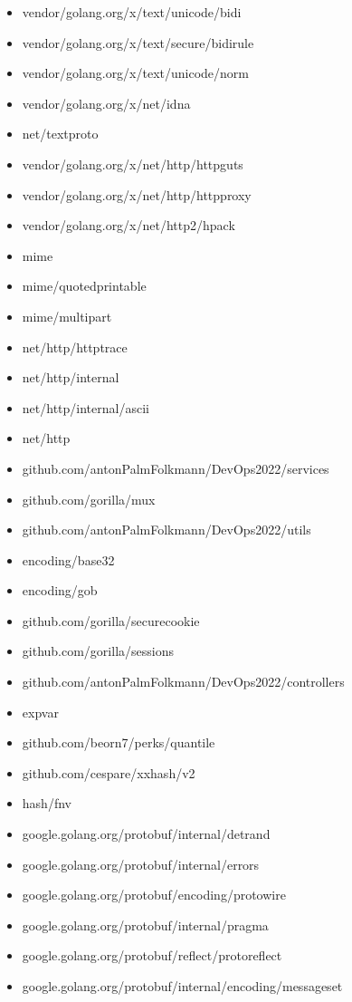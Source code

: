 \begin{itemize}
    \item vendor/golang.org/x/text/unicode/bidi
    \item vendor/golang.org/x/text/secure/bidirule
    \item vendor/golang.org/x/text/unicode/norm
    \item vendor/golang.org/x/net/idna
    \item net/textproto
    \item vendor/golang.org/x/net/http/httpguts
    \item vendor/golang.org/x/net/http/httpproxy
    \item vendor/golang.org/x/net/http2/hpack
    \item mime
    \item mime/quotedprintable
    \item mime/multipart
    \item net/http/httptrace
    \item net/http/internal
    \item net/http/internal/ascii
    \item net/http
    \item github.com/antonPalmFolkmann/DevOps2022/services
    \item github.com/gorilla/mux
    \item github.com/antonPalmFolkmann/DevOps2022/utils
    \item encoding/base32
    \item encoding/gob
    \item github.com/gorilla/securecookie
    \item github.com/gorilla/sessions
    \item github.com/antonPalmFolkmann/DevOps2022/controllers
    \item expvar
    \item github.com/beorn7/perks/quantile
    \item github.com/cespare/xxhash/v2
    \item hash/fnv
    \item google.golang.org/protobuf/internal/detrand
    \item google.golang.org/protobuf/internal/errors
    \item google.golang.org/protobuf/encoding/protowire
    \item google.golang.org/protobuf/internal/pragma
    \item google.golang.org/protobuf/reflect/protoreflect
    \item google.golang.org/protobuf/internal/encoding/messageset

\end{itemize}
